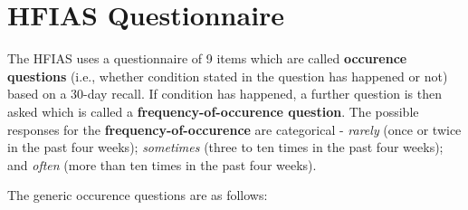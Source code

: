 \documentclass[12pt,]{book}
\theoremstyle{definition}
\theoremstyle{definition}
\theoremstyle{definition}
\theoremstyle{remark}
\begin{document}
\hypertarget{hfias-questionnaire}{%
\section{HFIAS Questionnaire}\label{hfias-questionnaire}}

The HFIAS uses a questionnaire of 9 items which are called
\textbf{occurence questions} (i.e., whether condition stated in the
question has happened or not) based on a 30-day recall. If condition has
happened, a further question is then asked which is called a
\textbf{frequency-of-occurence question}. The possible responses for the
\textbf{frequency-of-occurence} are categorical - \emph{rarely} (once or
twice in the past four weeks); \emph{sometimes} (three to ten times in
the past four weeks); and \emph{often} (more than ten times in the past
four weeks).

The generic occurence questions are as follows:
\end{document}
